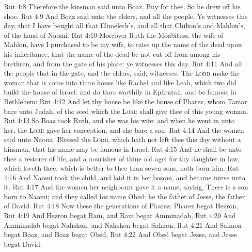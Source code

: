 \vs Rut 4:8 Therefore the kinsman said unto Boaz, Buy  for thee. So he drew off his shoe.
\vs Rut 4:9 And Boaz said unto the elders, and  all the people, Ye  witnesses this day, that I have bought all that  Elimelech's, and all that  Chilion's and Mahlon's, of the hand of Naomi.
\vs Rut 4:10 Moreover Ruth the Moabitess, the wife of Mahlon, have I purchased to be my wife, to raise up the name of the dead upon his inheritance, that the name of the dead be not cut off from among his brethren, and from the gate of his place: ye  witnesses this day.
\vs Rut 4:11 And all the people that  in the gate, and the elders, said,  witnesses. The \textsc{Lord} make the woman that is come into thine house like Rachel and like Leah, which two did build the house of Israel: and do thou worthily in Ephratah, and be famous in Bethlehem:
\vs Rut 4:12 And let thy house be like the house of Pharez, whom Tamar bare unto Judah, of the seed which the \textsc{Lord} shall give thee of this young woman.
\vs Rut 4:13 So Boaz took Ruth, and she was his wife: and when he went in unto her, the \textsc{Lord} gave her conception, and she bare a son.
\vs Rut 4:14 And the women said unto Naomi, Blessed  the \textsc{Lord}, which hath not left thee this day without a kinsman, that his name may be famous in Israel.
\vs Rut 4:15 And he shall be unto thee a restorer of  life, and a nourisher of thine old age: for thy daughter in law, which loveth thee, which is better to thee than seven sons, hath born him.
\vs Rut 4:16 And Naomi took the child, and laid it in her bosom, and became nurse unto it.
\vs Rut 4:17 And the women her neighbours gave it a name, saying, There is a son born to Naomi; and they called his name Obed: he  the father of Jesse, the father of David.
\vs Rut 4:18 Now these  the generations of Pharez: Pharez begat Hezron,
\vs Rut 4:19 And Hezron begat Ram, and Ram begat Amminadab,
\vs Rut 4:20 And Amminadab begat Nahshon, and Nahshon begat Salmon,
\vs Rut 4:21 And Salmon begat Boaz, and Boaz begat Obed,
\vs Rut 4:22 And Obed begat Jesse, and Jesse begat David.
